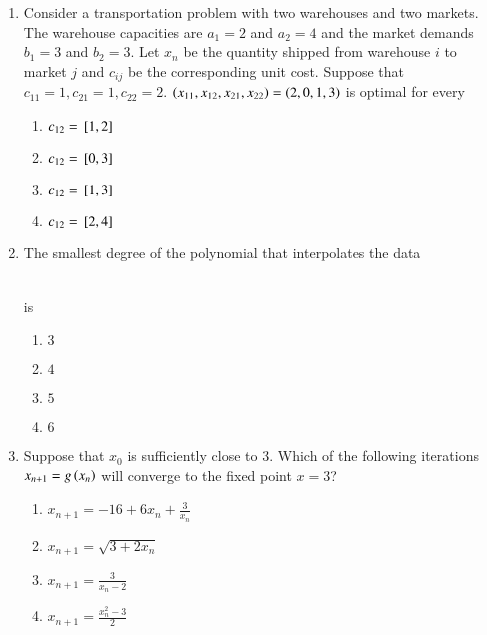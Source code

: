 \documentclass[journal,12pt,onecolumn]{IEEEtran}
\theoremstyle{remark}
\begin{document}
\begin{enumerate}
\begin{enumerate}
    \end{enumerate}
    \item Consider a transportation problem with two warehouses and two markets. The warehouse capacities are $a_1=2$ and $a_2=4$ and the market demands $b_1=3$ and $b_2=3$. Let $x_n$ be the quantity shipped from warehouse $i$ to market $j$ and $c_{ij}$ be the corresponding unit cost. Suppose that $c_{11}=1,c_{21}=1,c_{22}=2$. $\left(x_{11},x_{12},x_{21},x_{22}\right)=\left(2,0,1,3\right)$ is optimal for every 
    \begin{enumerate}
        \item $c_{12}={}\left[1,2\right]$
        \item $c_{12}={}\left[0,3\right]$
        \item $c_{12}={}\left[1,3\right]$
        \item $c_{12}={}\left[2,4\right]$
    \end{enumerate}
    \item The smallest degree of the polynomial that interpolates the data\\
    \begin{table}[h!]
        \centering
        
    \end{table}\\
    is
    \begin{enumerate}
        \item $3$
        \item $4$
        \item $5$
        \item $6$
    \end{enumerate}
    \item Suppose that $x_0$ is sufficiently close to $3$. Which of the following iterations $x_{n+1}=g\left(x_n\right)$ will converge to the fixed point $x=3$?
    \begin{enumerate}
        \item $x_{n+1}=-16+6x_n+\frac{3}{x_n}$
        \item $x_{n+1}=\sqrt{3+2x_n}$
        \item $x_{n+1}=\frac{3}{x_n-2}$
        \item $x_{n+1}=\frac{x_n^2-3}{2}$
    \end{enumerate}
    
    
     
\end{enumerate}
\end{document}
